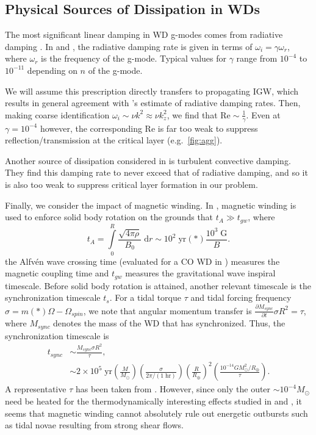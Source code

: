 \documentclass[
        fleqn,
        usenatbib,
    ]{mnras}
\newcommand*{\pd}[2]{\frac{\partial#1}{\partial#2}}
\newcommand*{\p}[1]{\left(#1\right)}
\begin{document}
\subsection{Physical Sources of Dissipation in WDs}\label{ss:disp}

The most significant linear damping in WD g-modes comes from radiative damping
\citep{fullerI}. In \citep{wu} and \citep{fullerI}, the radiative damping rate
is given in terms of $\omega_i = \gamma \omega_r$, where $\omega_r$ is the
frequency of the g-mode. Typical values for $\gamma$ range from $10^{-4}$ to
$10^{-11}$ depending on $n$ of the g-mode.

We will assume this prescription directly transfers to propagating IGW, which
results in general agreement with \citep{bukart}'s estimate of radiative damping
rates. Then, making coarse identification $\omega_i \sim \nu k^2 \approx \nu
k_z^2$, we find that $\mathrm{Re} \sim \frac{1}{\gamma}$. Even at $\gamma =
10^{-4}$ however, the corresponding $\mathrm{Re}$ is far too weak to suppress
reflection/transmission at the critical layer (e.g.\ \autoref{fig:agg}).

Another source of dissipation considered in \citep{bukart} is turbulent
convective damping. They find this damping rate to never exceed that of
radiative damping, and so it is also too weak to suppress critical layer
formation in our problem.

Finally, we consider the impact of magnetic winding. In \citep{bukart}, magnetic
winding is used to enforce solid body rotation on the grounds that $t_A \gg
t_{gw}$, where
\begin{equation}
    t_A = \int\limits_0^R \frac{\sqrt{4\pi \rho}}{B_0}\;\mathrm{d}r
        \sim 10^2\;\mathrm{yr}\p*{\frac{10^3\;\mathrm{G}}{B}}.
\end{equation}
the Alfv\'en wave crossing time (evaluated for a CO WD in \citep{fullerIV})
measures the magnetic coupling time and $t_{gw}$ measures the gravitational wave
inspiral timescale. Before solid body rotation is attained, another relevant
timescale is the synchronization timescale $t_s$. For a tidal torque $\tau$ and
tidal forcing frequency $\sigma = m\p*{\Omega - \Omega_{spin}}$, we note that
angular momentum transfer is $\pd{M_{sync}}{t} \sigma R^2 = \tau$, where
$M_{sync}$ denotes the mass of the WD that has synchronized. Thus, the
synchronization timescale is
\begin{align}
    t_{sync} &\sim \frac{M_{sync}\sigma R^2}{\tau},\nonumber\\
        &\sim 2 \times 10^5\;\mathrm{yr}
            \p{\frac{M}{M_{\odot}}}
            \p{\frac{\sigma}{2\pi / (1\;\mathrm{hr})}}
            \p{\frac{R}{R_{\oplus}}}^2
            \p{\frac{10^{-14} GM_{\odot}^2/R_{\oplus}}{\tau}}.
\end{align}
A representative $\tau$ has been taken from \citep{bukart}. However, since only
the outer $\sim 10^{-4}M_{\odot}$ need be heated for the thermodynamically
interesting effects studied in \citep{fullerIV} and \citep{tidal_novae}, it
seems that magnetic winding cannot absolutely rule out energetic outbursts such
as tidal novae resulting from strong shear flows.
\end{document}
